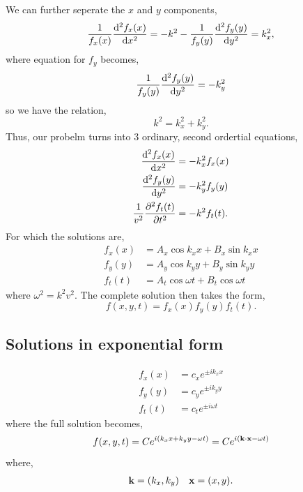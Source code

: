 \documentclass{book}
\begin{document}
We can further seperate the $x$ and $y$ components,
\begin{equation}
	\frac{1}{f_x(x)}\dv[2]{f_x(x)}{x} = -k^2 - \frac{1}{f_y(y)}\dv[2]{f_y(y)}{y} = k_x^2,
\end{equation}
where equation for $f_y$ becomes,
\begin{equation}
	 \frac{1}{f_y(y)}\dv[2]{f_y(y)}{y} = -k_y^2
\end{equation}
so we have the relation,
\begin{equation}
	k^2 = k_x^2 + k_y^2.
\end{equation}
Thus, our probelm turns into 3 ordinary, second ordertial equations,
\begin{align}
	\dv[2]{f_x(x)}{x} & = -k_x^2f_x(x) \\	
	\dv[2]{f_y(y)}{y} & = -k_y^2f_y(y) \\
	\frac{1}{v^2} \pdv[2]{f_t(t)}{t} & = -k^2f_t(t).
\end{align}
For which the solutions are,
\begin{align}
	f_x(x) & = A_x\cos k_xx + B_x\sin k_x x \label{xsol} \\ 
	f_y(y) & = A_y\cos k_yy + B_y\sin k_y y \label{ysol} \\ 
	f_t(t) & = A_t\cos\omega t + B_t \cos\omega t 	\label{tsol}
\end{align}
where $\omega^2 = k^2v^2$. The complete solution then takes the form,
\begin{equation}
	f(x,y,t) = f_x(x)f_y(y)f_t(t).
\end{equation}
\subsection{Solutions in exponential form}
\begin{align}
	f_x(x) &= c_xe^{\pm ik_x x} \\
	f_y(y) &= c_ye^{\pm ik_y y} \\
	f_t(t) &= c_te^{\pm i\omega t}
\end{align}
where the full solution becomes,
\begin{equation}
	f(x,y,t) = Ce^{i(k_xx + k_yy - \omega t)} = Ce^{i(\vb{k}\cdot\vb{x}-\omega t)}
\end{equation}
where,
\begin{align}
	\vb{k} = (k_x, k_y) && \vb{x} = (x,y).
\end{align}
\end{document}
